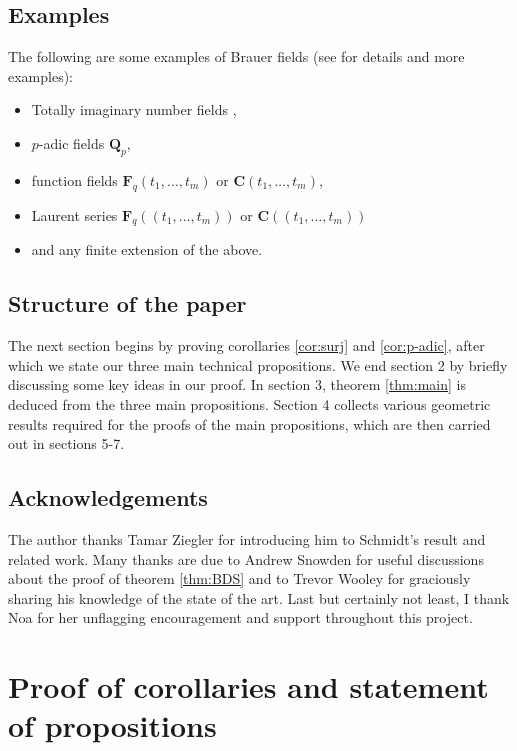 \documentclass[12pt]{amsart}
\theoremstyle{definition}
\newcommand{\F}{\mathbf{F}}
\newcommand{\Q}{\mathbf{Q}}
\newcommand{\C}{\mathbf{C}}
\begin{document}
\subsection{Examples}\label{Brauer-examples}
    The following are some examples of Brauer fields (see \cite{BDS} for details and more examples):
\begin{itemize}
    \item Totally imaginary number fields \cite{Peck},
    \item $p$-adic fields $\Q_p$,
    \item function fields $\F_q(t_1,\ldots,t_m)$ or $\C(t_1,\dots,t_m)$,
    \item Laurent series $\F_q(\!(t_1,\ldots,t_m)\!)$ or $\C(\!(t_1,\ldots,t_m)\!)$
    \item and any finite extension of the above.
\end{itemize}



\subsection{Structure of the paper}
The next section begins by proving corollaries \ref{cor:surj} and \ref{cor:p-adic}, after which we state our three main technical propositions. We end section 2 by briefly discussing some key ideas in our proof. In section 3, theorem \ref{thm:main} is deduced from the three main propositions. Section 4 collects various geometric results required for the proofs of the main propositions, which are then carried out in sections 5-7.  

\subsection{Acknowledgements} The author thanks Tamar Ziegler for introducing him to Schmidt's result \cite{Schmidt} and related work. Many thanks are due to Andrew Snowden for useful discussions about the proof of theorem \ref{thm:BDS} and to Trevor Wooley for graciously sharing his knowledge of the state of the art. Last but certainly not least, I thank Noa for her unflagging encouragement and support throughout this project.



\section{Proof of corollaries and statement of propositions}
\end{document}
